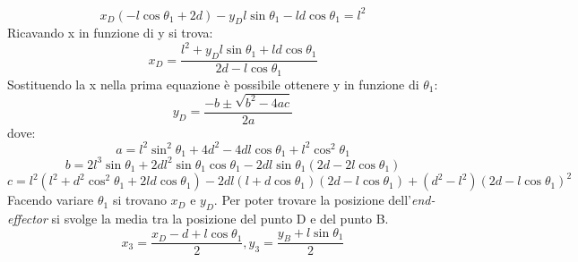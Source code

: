 \begin{equation*}
	x_D(-l\cos\theta_1+2d) -y_Dl\sin\theta_1 - ld\cos\theta_1 = l^2
\end{equation*}
Ricavando x in funzione di y si trova:
\begin{equation*}
	x_{D} = \frac{l^2+y_{D}l\sin\theta_1+ld\cos\theta_1}{2d-l\cos\theta_1}
\end{equation*}
 Sostituendo la x nella prima equazione è possibile ottenere y in funzione di $\theta_1$:
 \begin{equation}
 	y_{D} = \frac{-b\pm \sqrt{b^2-4ac}}{2a}
 \end{equation}
 dove:
\begin{equation*}
	a = l^2\sin^2\theta_1 + 4d^2-4dl\cos\theta_1 + l^2\cos^2\theta_1
\end{equation*}
\begin{equation*}
	b = 2l^3\sin\theta_1 + 2dl^2\sin\theta_1\cos\theta_1-2dl\sin\theta_1(2d-2l\cos\theta_1)
\end{equation*}
\begin{equation*}
	c = l^2(l^2+d^2\cos^2\theta_1+2ld\cos\theta_1)-2dl(l+d\cos\theta_1)(2d-l\cos\theta_1)+(d^2-l^2)(2d-l\cos\theta_1)^2
\end{equation*}
Facendo variare $\theta_1$ si trovano $x_D$ e $y_D$. Per poter trovare la posizione dell'\textit{end-effector} si svolge la media tra la posizione del punto D e del punto B.
\begin{equation}
	x_3 = \frac{x_D-d+l\cos\theta_1}{2}, y_3 = \frac{y_B+l\sin\theta_1}{2}
\end{equation}

